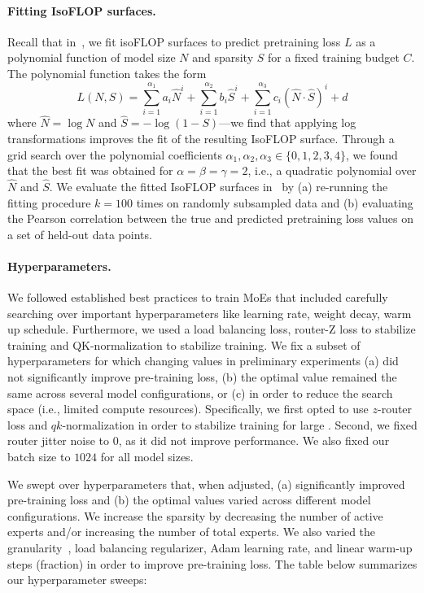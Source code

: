 \paragraph{Fitting IsoFLOP surfaces.}
Recall that in~, we fit isoFLOP surfaces to predict pretraining loss $L$ as a polynomial function of model size $N$ and \moe sparsity $S$ for a fixed training budget $C$.
The polynomial function takes the form
\begin{equation}
    \label{eq:isoFLOP_surface}
    L(N, S) = \sum^{\alpha_1}_{i=1} a_i \hat{N}^{i} + \sum^{\alpha_2}_{i=1} b_i \hat{S}^{i} + \sum^{\alpha_3}_{i=1} c_i (\hat{N} \cdot \hat{S})^{i} + d
\end{equation}
where $\hat{N} = \log N$ and $\hat{S} = -\log(1-S)$---we find that applying log transformations improves the fit of the resulting IsoFLOP surface.
Through a grid search over the polynomial coefficients $\alpha_1, \alpha_2, \alpha_3 \in \{0, 1, 2, 3, 4\}$, we found that the best fit was obtained for $\alpha = \beta = \gamma = 2$, i.e., a quadratic polynomial over $\hat{N}$ and $\hat{S}$.
We evaluate the fitted IsoFLOP surfaces in~ by (a) re-running the fitting procedure $k=100$ times on randomly subsampled data and (b) evaluating the Pearson correlation between the true and predicted pretraining loss values on a set of held-out data points.

\paragraph{Hyperparameters.} 
We followed established best practices to train MoEs that included carefully searching over important hyperparameters like learning rate, weight decay, warm up schedule. Furthermore, we used a load balancing loss, router-Z loss to stabilize training and QK-normalization to stabilize training.
We fix a subset of hyperparameters for which changing values in preliminary experiments  (a) did not significantly improve pre-training loss, (b) the optimal value remained the same across several model configurations, or (c) in order to reduce the search space (i.e., limited compute resources). 
Specifically, we first opted to use $z$-router loss \cite{zoph2022st} and $qk$-normalization \cite{wortsman2023small} in order to stabilize training for large \moes. 
Second, we fixed \moe router jitter noise to $0$, as it did not improve performance. 
We also fixed our batch size to $1024$ for all model sizes.

We swept over hyperparameters that, when adjusted, (a) significantly improved pre-training loss and (b) the optimal values varied across different model configurations. We increase the \moe sparsity by decreasing the number of active experts and/or increasing the number of total experts. We also varied the \moe granularity~\cite{ludziejewski2024scaling}, \moe load balancing regularizer, Adam learning rate, and linear warm-up steps (fraction) in order to improve pre-training loss. The table below summarizes our hyperparameter sweeps:

